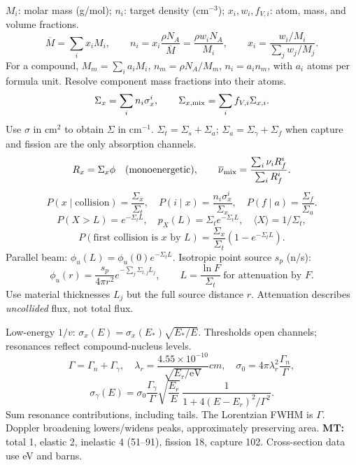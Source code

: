 \begin{handoutcolumns}
\switchcolumn\RaggedRight
$M_i$: molar mass (g/mol); $n_i$: target density (cm$^{-3}$);
$x_i,w_i,f_{V,i}$: atom, mass, and volume fractions.
\[
 \overline M=\sum_i x_iM_i,\qquad
 n_i=x_i\frac{\rho N_A}{\overline M}
       =\frac{\rho w_iN_A}{M_i},\qquad
 x_i=\frac{w_i/M_i}{\sum_jw_j/M_j}.
\]
For a compound, $M_m=\sum_i a_iM_i$, $n_m=\rho N_A/M_m$,
$n_i=a_in_m$, with $a_i$ atoms per formula unit.
Resolve component mass fractions into their atoms.
\[
 \Sigma_x=\sum_i n_i\sigma_x^i,\qquad
 \Sigma_{x,\rm mix}=\sum_i f_{V,i}\Sigma_{x,i}.
\]
Use $\sigma$ in cm$^2$ to obtain $\Sigma$ in cm$^{-1}$.
$\Sigma_t=\Sigma_s+\Sigma_a$; $\Sigma_a=\Sigma_\gamma+\Sigma_f$
when capture and fission are the only absorption channels.
\[
 R_x=\Sigma_x\phi\quad\text{(monoenergetic)},\qquad
 \overline\nu_{\rm mix}=\frac{\sum_i\nu_iR_f^i}{\sum_iR_f^i}.
\]
\[
 P(x\mid\mathrm{collision})=\frac{\Sigma_x}{\Sigma_t},\quad
 P(i\mid x)=\frac{n_i\sigma_x^i}{\Sigma_x},\quad
 P(f\mid a)=\frac{\Sigma_f}{\Sigma_a}.
\]
\[
 P(X>L)=e^{-\Sigma_tL},\quad p_X(L)=\Sigma_te^{-\Sigma_tL},
 \quad\langle X\rangle=1/\Sigma_t,
\]
\[
 P(\text{first collision is }x\text{ by }L)
 =\frac{\Sigma_x}{\Sigma_t}(1-e^{-\Sigma_tL}).
\]
Parallel beam: $\phi_u(L)=\phi_u(0)e^{-\Sigma_tL}$.
Isotropic point source $s_p$ (n/s):
\[
 \phi_u(r)=\frac{s_p}{4\pi r^2}e^{-\sum_j\Sigma_{t,j}L_j},
 \qquad L=\frac{\ln F}{\Sigma_t}\ \text{for attenuation by }F.
\]
Use material thicknesses $L_j$ but the full source distance $r$.
Attenuation describes \emph{uncollided} flux, not total flux.

Low-energy $1/v$: $\sigma_x(E)=\sigma_x(E_*)\sqrt{E_*/E}$.
Thresholds open channels; resonances reflect compound-nucleus levels.
\[
 \Gamma=\Gamma_n+\Gamma_\gamma,\quad
 \lambda_r=\frac{4.55\times10^{-10}}{\sqrt{E_r/\mathrm{eV}}}\unit{cm},
 \quad \sigma_0=4\pi\lambda_r^2\frac{\Gamma_n}{\Gamma},
\]
\[
 \sigma_\gamma(E)=\sigma_0\frac{\Gamma_\gamma}{\Gamma}
 \sqrt{\frac{E_r}{E}}\,
 \frac{1}{1+4(E-E_r)^2/\Gamma^2}.
\]
Sum resonance contributions, including tails. The Lorentzian FWHM
is $\Gamma$. Doppler broadening lowers/widens peaks, approximately
preserving area. \textbf{MT:} total 1, elastic 2, inelastic 4 (51--91),
fission 18, capture 102. Cross-section data use eV and barns.


\end{handoutcolumns}

